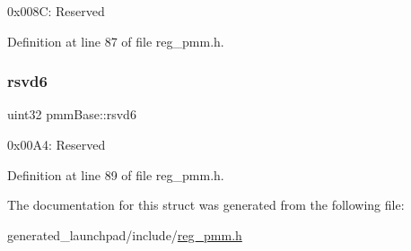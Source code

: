 0x008C\+: Reserved 

Definition at line 87 of file reg\+\_\+pmm.\+h.

\mbox{\label{structpmmBase_a335f472f79d6353f2375f97171e9c029}} 
\subsubsection{\texorpdfstring{rsvd6}{rsvd6}}
{\footnotesize\ttfamily uint32 pmm\+Base\+::rsvd6}

0x00\+A4\+: Reserved 

Definition at line 89 of file reg\+\_\+pmm.\+h.



The documentation for this struct was generated from the following file\+:\begin{DoxyCompactItemize}
\item 
generated\+\_\+launchpad/include/\mbox{\hyperlink{reg__pmm_8h}{reg\+\_\+pmm.\+h}}\end{DoxyCompactItemize}
